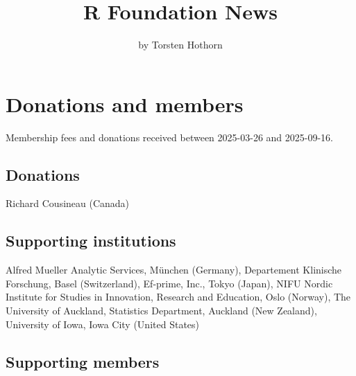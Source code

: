 \title{R Foundation News}


\author{by Torsten Hothorn}

\maketitle


\section{Donations and members}\label{donations-and-members}

Membership fees and donations received between
2025-03-26 and 2025-09-16.

\subsection{Donations}\label{donations}

Richard Cousineau (Canada)

\subsection{Supporting institutions}\label{supporting-institutions}

Alfred Mueller Analytic Services, München (Germany),
Departement Klinische Forschung, Basel (Switzerland),
Ef-prime, Inc., Tokyo (Japan),
NIFU Nordic Institute for Studies in Innovation, Research and Education, Oslo (Norway),
The University of Auckland, Statistics Department, Auckland (New Zealand),
University of Iowa, Iowa City (United States)

\subsection{Supporting members}\label{supporting-members}

